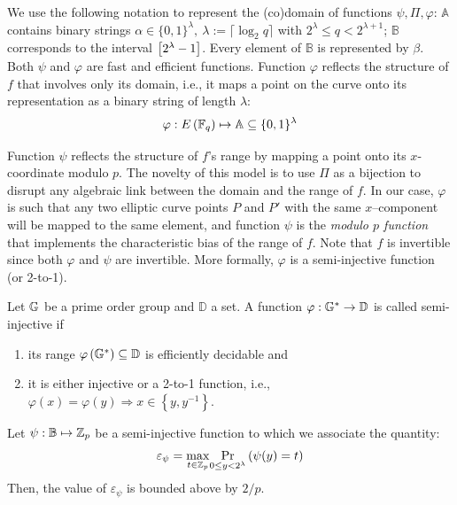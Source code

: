 \documentclass[version=submission, floatrow]{iacrcc}
\begin{document}
We use the following notation to represent the (co)domain of functions $\psi, \Pi, \varphi$: $\mathbb{A}$ contains binary strings $\alpha \in \{0,1\}^{\lambda},\ \lambda := \lceil\log_{2}{q}\rceil$ with $2^{\lambda} \le q < 2^{\lambda+1}$; $\mathbb{B}$ corresponds to the interval $\left[2^{\lambda}-1\right]$. Every element of $\mathbb{B}$ is represented by $\beta$. Both $\psi$ and $\varphi$ are fast and efficient functions. Function $\varphi$ reflects the structure of $f$ that involves only its domain, i.e., it maps a point on the curve onto its representation as a binary string of length $\lambda$:\[
    \varphi: E \left(\mathbb{F}_{q}\right) \mapsto \mathbb{A} \subseteq \{0,1\}^{\lambda}
\]

Function $\psi$ reflects the structure of $f$'s range by mapping a point onto its $x$-coordinate modulo $p$. The novelty of this model is to use $\Pi$ as a bijection to disrupt any algebraic link between the domain and the range of $f$. In our case, $\varphi$ is such that any two elliptic curve points $P$ and $P'$ with the same $x$--component will be mapped to the same element, and function $\psi$ is the \emph{modulo $p$ function} that implements the characteristic bias of the range of $f$. Note that $f$ is invertible since both $\varphi$ and $\psi$ are invertible. More formally, $\varphi$ is a semi-injective function (or 2-to-1).

\begin{definition}\label{definition: semi-injective function}
Let $\mathbb{G}$ be a prime order group and $\mathbb{D}$ a set. A function $\varphi:\mathbb{G}^{*} \rightarrow \mathbb{D}$ is called semi-injective if\begin{enumerate}[label={\emph{\roman*})}]
\item its range $\varphi\left(\mathbb{G}^{*}\right) \subseteq \mathbb{D}$ is efficiently decidable and
\item it is either injective or a 2-to-1 function, i.e.,  $\varphi\left(x\right) = \varphi\left(y\right) \Longrightarrow x \in \left\{y, y^{-1}\right\}$.
\end{enumerate}
\end{definition}

\begin{corollary}\label{corollary: psi quantity}
Let $\psi : \mathbb{B} \mapsto \mathbb{Z}_{p}$  be a semi-injective function to which we associate the quantity:
\[
    \varepsilon_{\psi} = \underset{t \in \mathbb{Z}_{p}}{\max} \underset{{0 \le y < 2^{\lambda}}}{\mathrm{Pr}}  \left(\psi(y) = t\right)
\]    
Then, the value of $\varepsilon_\psi$ is bounded above by $2/p$.
\end{corollary}
\end{document}
